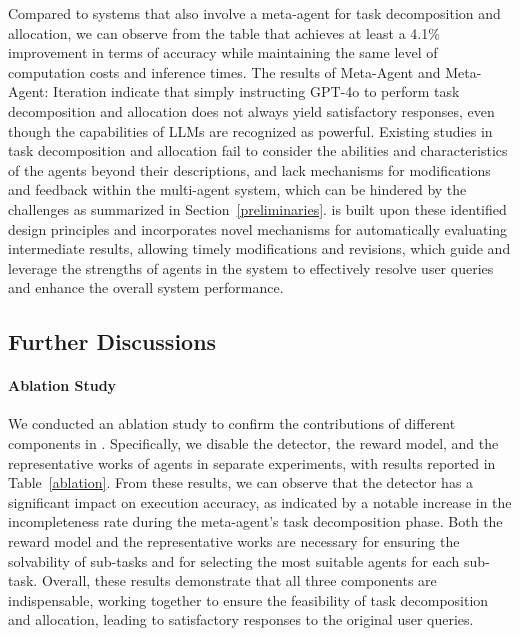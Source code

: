 Compared to systems that also involve a meta-agent for task decomposition and allocation, we can observe from the table that \name achieves at least a 4.1\% improvement in terms of accuracy while maintaining the same level of computation costs and inference times. The results of Meta-Agent and Meta-Agent: Iteration indicate that simply instructing GPT-4o to perform task decomposition and allocation does not always yield satisfactory responses, even though the capabilities of LLMs are recognized as powerful.
Existing studies in task decomposition and allocation fail to consider the abilities and characteristics of the agents beyond their descriptions, and lack mechanisms for modifications and feedback within the multi-agent system, which can be hindered by the challenges as summarized in Section~\ref{preliminaries}. 
\name is built upon these identified design principles and incorporates novel mechanisms for automatically evaluating intermediate results, allowing timely modifications and revisions, which guide and leverage the strengths of agents in the system to effectively resolve user queries and enhance the overall system performance. 




\subsection{Further Discussions}
\paragraph{Ablation Study}
We conducted an ablation study to confirm the contributions of different components in \name. Specifically, we disable the detector, the reward model, and the representative works of agents in separate experiments, with results reported in Table~\ref{ablation}.
From these results, we can observe that the detector has a significant impact on execution accuracy, as indicated by a notable increase in the incompleteness rate during the meta-agent's task decomposition phase. 
Both the reward model and the representative works are necessary for ensuring the solvability of sub-tasks and for selecting the most suitable agents for each sub-task. 
Overall, these results demonstrate that all three components are indispensable, working together to ensure the feasibility of task decomposition and allocation, leading to satisfactory responses to the original user queries. 



